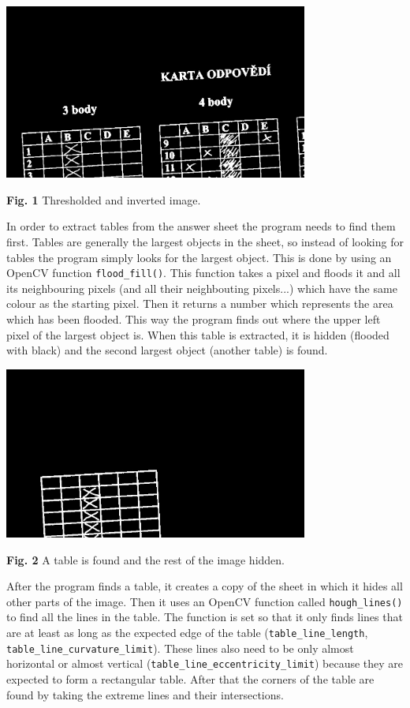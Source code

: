 \documentclass{article}
\begin{document}
{{{		\begin{center}
			\includegraphics[width=10cm]{01.jpg} \par
			{\bf Fig. 1} Thresholded and inverted image. \par
		\end{center}

		In order to extract tables from the answer sheet the program needs to find them first. Tables are generally the largest objects in the sheet, so instead of looking for tables the program simply looks for the largest object. This is done by using an OpenCV function \verb+flood_fill()+. This function takes a pixel and floods it and all its neighbouring pixels (and all their neighbouting pixels...) which have the same colour as the starting pixel. Then it returns a number which represents the area which has been flooded. This way the program finds out where the upper left pixel of the largest object is. When this table is extracted, it is hidden (flooded with black) and the second largest object (another table) is found.

		\begin{center}
			\includegraphics[width=10cm]{02.jpg} \par
			{\bf Fig. 2} A table is found and the rest of the image hidden. \par
		\end{center}

		After the program finds a table, it creates a copy of the sheet in which it hides all other parts of the image. Then it uses an OpenCV function called \verb+hough_lines()+ to find all the lines in the table. The function is set so that it only finds lines that are at least as long as the expected edge of the table (\verb+table_line_length+, \verb+table_line_curvature_limit+). These lines also need to be only almost horizontal or almost vertical (\verb+table_line_eccentricity_limit+) because they are expected to form a rectangular table. After that the corners of the table are found by taking the extreme lines and their intersections.

}}}
\end{document}
